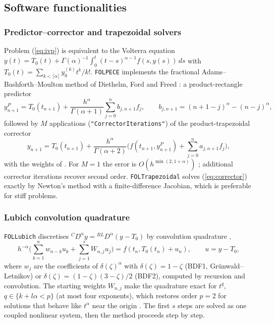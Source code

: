 \documentclass[11pt]{article}
\begin{document}
\subsection{Software functionalities}
\subsubsection{Predictor--corrector and trapezoidal solvers}
Problem (\ref{eq:ivp}) is equivalent to the Volterra equation $y(t)=T_0(t)+\Gamma(\alpha)^{-1}\int_0^t(t-s)^{\alpha-1}f(s,y(s))\,ds$ with $T_0(t)=\sum_{k<\lceil\alpha\rceil}y_0^{(k)}t^k/k!$. \texttt{FOLPECE} implements the fractional Adams--Bashforth--Moulton method of Diethelm, Ford and Freed \cite{dff2002,dff2004}: a product-rectangle predictor
\begin{equation}
y^{P}_{n+1}=T_0(t_{n+1})+\frac{h^{\alpha}}{\Gamma(\alpha+1)}\sum_{j=0}^{n}b_{j,n+1}f_j,\qquad b_{j,n+1}=(n+1-j)^{\alpha}-(n-j)^{\alpha},
\end{equation}
followed by $M$ applications (\texttt{"CorrectorIterations"}) of the product-trapezoidal corrector
\begin{equation}\label{eq:corrector}
y_{n+1}=T_0(t_{n+1})+\frac{h^{\alpha}}{\Gamma(\alpha+2)}\Big(f(t_{n+1},y^{P}_{n+1})+\sum_{j=0}^{n}a_{j,n+1}f_j\Big),
\end{equation}
with the weights of \cite{dff2002}. For $M=1$ the error is $O(h^{\min(2,1+\alpha)})$ \cite{dff2004}; additional corrector iterations recover second order. \texttt{FOLTrapezoidal} solves (\ref{eq:corrector}) exactly by Newton's method with a finite-difference Jacobian, which is preferable for stiff problems.

\subsubsection{Lubich convolution quadrature}
\texttt{FOLLubich} discretises ${}^{C}\!D^{\alpha}y={}^{RL}\!D^{\alpha}(y-T_0)$ by convolution quadrature \cite{lubich1986,lubich1988},
\begin{equation}\label{eq:cq}
h^{-\alpha}\Big(\sum_{k=1}^{n}w_{n-k}u_k+\sum_{j=1}^{s}W_{n,j}u_j\Big)=f(t_n,T_0(t_n)+u_n),\qquad u=y-T_0,
\end{equation}
where $w_j$ are the coefficients of $\delta(\zeta)^{\alpha}$ with $\delta(\zeta)=1-\zeta$ (BDF1, Gr\"unwald--Letnikov) or $\delta(\zeta)=(1-\zeta)(3-\zeta)/2$ (BDF2), computed by recursion and convolution. The starting weights $W_{n,j}$ make the quadrature exact for $t^{q}$, $q\in\{k+l\alpha<p\}$ (at most four exponents), which restores order $p=2$ for solutions that behave like $t^{\alpha}$ near the origin \cite{lubich1986,dff2006}. The first $s$ steps are solved as one coupled nonlinear system, then the method proceeds step by step.
\end{document}
